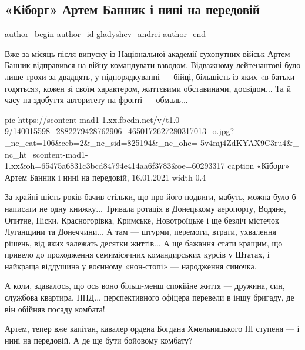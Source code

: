  
 
 
 
 
\subsection{«Кіборг» Артем Банник і нині на передовій}
\label{sec:16_01_2021.fb.gladyshev_andrei.2.kiborg_artem_bannyk}

\ifcmt
  author_begin
   author_id gladyshev_andrei
  author_end
\fi

Вже за місяць після випуску із Національної академії сухопутних військ Артем
Банник відправився на війну командувати взводом. Відважному лейтенантові було
лише трохи за двадцять, у підпорядкуванні — бійці, більшість із яких «в батьки
годяться», кожен зі своїм характером, життєвими обставинами, досвідом... Та й
часу на здобуття авторитету на фронті — обмаль...

\ifcmt
  pic https://scontent-mad1-1.xx.fbcdn.net/v/t1.0-9/140015598_2882279428762906_4650172627280317013_o.jpg?_nc_cat=106&ccb=2&_nc_sid=825194&_nc_ohc=-5v4mj4ZdKYAX9C3ru4&_nc_ht=scontent-mad1-1.xx&oh=65475a6831c3bcd84794e414aa6f3783&oe=60293317
	caption «Кіборг» Артем Банник і нині на передовій, 16.01.2021
  width 0.4
\fi

За крайні шість років бачив стільки, що про його подвиги, мабуть, можна було б
написати не одну книжку... Тривала ротація в Донецькому аеропорту, Водяне,
Опитне, Піски, Красногорівка, Кримське, Новотроїцьке і ще безліч містечок
Луганщини та Донеччини... А там — штурми, перемоги, втрати, ухвалення рішень,
від яких залежать десятки життів... А ще бажання стати кращим, що привело до
проходження семимісячних командирських курсів у Штатах, і найкраща віддушина у
воєнному «нон-стопі» — народження синочка.

А коли, здавалось, що ось воно більш-менш спокійне життя — дружина, син,
службова квартира, ППД... перспективного офіцера перевели в іншу бригаду, де
він обійняв посаду комбата!

Артем, тепер вже капітан, кавалер ордена Богдана Хмельницького ІІІ ступеня — і
нині на передовій. А де ще бути бойовому комбату?

